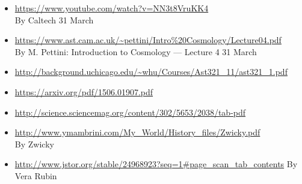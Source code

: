 \documentclass[10pt,a4paper]{article}
\begin{document}
\begin{itemize}
\item 
\url{https://www.youtube.com/watch?v=NN3t8VruKK4}\\
By Caltech 31 March
\item 
\url{https://www.ast.cam.ac.uk/~pettini/Intro%20Cosmology/Lecture04.pdf}\\
By M. Pettini: Introduction to Cosmology — Lecture 4 31 March
\item
\url{http://background.uchicago.edu/~whu/Courses/Ast321_11/ast321_1.pdf}
\item
\url{https://arxiv.org/pdf/1506.01907.pdf}
\item
\url{http://science.sciencemag.org/content/302/5653/2038/tab-pdf}
\item 
\url{http://www.ymambrini.com/My_World/History_files/Zwicky.pdf}
\\ By Zwicky

\item \url{http://www.jstor.org/stable/24968923?seq=1#page_scan_tab_contents}
By Vera Rubin









\end{itemize}
\end{document}
